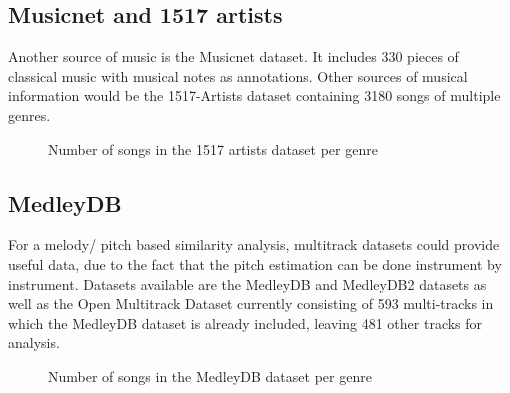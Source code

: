 \subsection{Musicnet and 1517 artists}

Another source of music is the Musicnet dataset.\cite{musicnet1} It includes 330 pieces of classical music with musical notes as annotations. 
Other sources of musical information would be the 1517-Artists dataset containing 3180 songs of multiple genres. \cite{1517artists1}

\begin{figure}[thpb]
	\centering
	\caption{Number of songs in the 1517 artists dataset per genre}
	\label{1517dist}
\end{figure}
\FloatBarrier

\subsection{MedleyDB}

For a melody/ pitch based similarity analysis, multitrack datasets could provide useful data, due to the fact that the pitch estimation can be done instrument by instrument. 
Datasets available are the MedleyDB\cite{medleydb1} and MedleyDB2\cite{medleydb2} datasets as well as the Open Multitrack Dataset\cite{openmult1} currently consisting of 593 multi-tracks in which the MedleyDB dataset is already included, leaving 481 other tracks for analysis.

\begin{figure}[thpb]
	\centering
	\caption{Number of songs in the MedleyDB dataset per genre}
	\label{medleydbdist}
\end{figure}
\FloatBarrier

